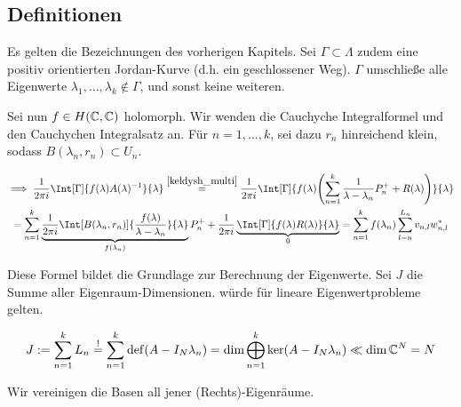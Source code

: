 \subsection*{Definitionen}

Es gelten die Bezeichnungen des vorherigen Kapitels.
Sei $\Gamma \subset \Lambda$ zudem eine positiv orientierten Jordan-Kurve (d.h. ein geschlossener Weg).
$\Gamma$ umschließe alle Eigenwerte $\lambda_1, \dots, \lambda_k \not \in \Gamma$, und sonst keine weiteren.



Sei nun $f \in H(\mathbb{C}, \mathbb{C})$ holomorph.
Wir wenden die Cauchyche Integralformel und den Cauchychen Integralsatz an.
Für $n = 1, \dots, k$, sei dazu $r_n$ hinreichend klein, sodass $B(\lambda_n, r_n) \subset U_n$.

\begin{multline} \label{eq:cauchysche_integral_formel_satz}
    \implies
    \frac{1}{2 \pi i}
    \Int[\Gamma]
    {
        f(\lambda) A(\lambda)^{-1}
    }{\lambda}
    \stackrel
    {
        \ref{keldysh_multi}
    }{=}
    \frac{1}{2 \pi i}
    \Int[\Gamma]
    {
        f(\lambda)
        \pbraces
        {
            \sum_{n=1}^k
                \frac{1}{\lambda - \lambda_n} P_n^+
                +
                R(\lambda)
        }
    }{\lambda} \\
    =
    \sum_{n=1}^k
        \underbrace
        {
            \frac{1}{2 \pi i}
            \Int[B(\lambda_n, r_n)]
            {
                \frac{f(\lambda)}{\lambda - \lambda_n}
            }{\lambda}
        }_{f(\lambda_n)}
        P_n^+
    +
    \frac{1}{2 \pi i}
    \underbrace
    {
        \Int[\Gamma]
        {
            f(\lambda) R(\lambda)
        }{\lambda}
    }_0
    =
    \sum_{n=1}^k
        f(\lambda_n)
        \sum_{l=n}^{L_n}
            v_{n, l} w_{n, l}^\ast
\end{multline}

Diese Formel bildet die Grundlage zur Berechnung der Eigenwerte.
Sei $J$ die Summe aller Eigenraum-Dimensionen.
\Quote{!} würde für lineare Eigenwertprobleme gelten.

\begin{align*}
    J
    :=
    \sum_{n=1}^k
        L_n
    \stackrel{!}{=}
    \sum_{n=1}^k
        \operatorname{def}(A - I_N \lambda_n)
    =
    \dim
    \bigoplus_{n=1}^k
        \ker (A - I_N \lambda_n)
    \ll
    \dim \mathbb{C}^N
    =
    N
\end{align*}

Wir vereinigen die Basen all jener (Rechts)-Eigenräume.

